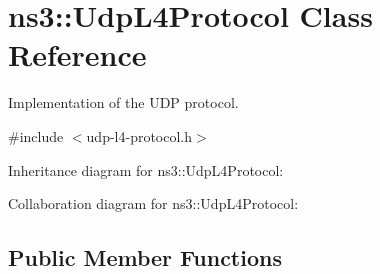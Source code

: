 \hypertarget{classns3_1_1UdpL4Protocol}{}\section{ns3\+:\+:Udp\+L4\+Protocol Class Reference}
\label{classns3_1_1UdpL4Protocol}


Implementation of the U\+DP protocol.  




{\ttfamily \#include $<$udp-\/l4-\/protocol.\+h$>$}



Inheritance diagram for ns3\+:\+:Udp\+L4\+Protocol\+:


Collaboration diagram for ns3\+:\+:Udp\+L4\+Protocol\+:
\subsection*{Public Member Functions}
